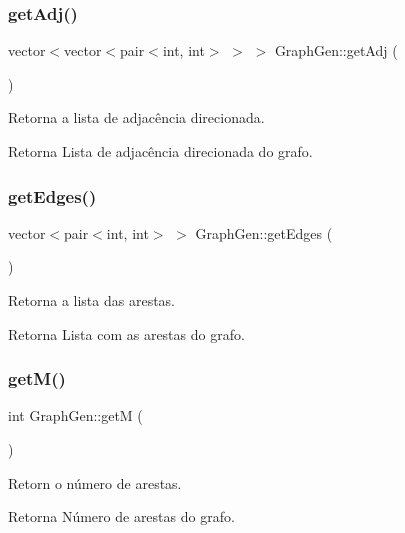 \subsubsection{\texorpdfstring{get\+Adj()}{getAdj()}}
{\footnotesize\ttfamily vector$<$vector$<$pair$<$int, int$>$ $>$ $>$ Graph\+Gen\+::get\+Adj (\begin{DoxyParamCaption}{ }\end{DoxyParamCaption})}

Retorna a lista de adjacência direcionada. \begin{DoxyReturn}{Retorna}
Lista de adjacência direcionada do grafo. 
\end{DoxyReturn}
\mbox{\label{classGraphGen_af140b74e5bbb7171a0b76f73d10c14ae}} 
\subsubsection{\texorpdfstring{get\+Edges()}{getEdges()}}
{\footnotesize\ttfamily vector$<$pair$<$int, int$>$ $>$ Graph\+Gen\+::get\+Edges (\begin{DoxyParamCaption}{ }\end{DoxyParamCaption})}

Retorna a lista das arestas. \begin{DoxyReturn}{Retorna}
Lista com as arestas do grafo. 
\end{DoxyReturn}
\mbox{\label{classGraphGen_aad12bcf774a0fa97150b01126d3a3e90}} 
\subsubsection{\texorpdfstring{get\+M()}{getM()}}
{\footnotesize\ttfamily int Graph\+Gen\+::getM (\begin{DoxyParamCaption}{ }\end{DoxyParamCaption})}

Retorn o número de arestas. \begin{DoxyReturn}{Retorna}
Número de arestas do grafo. 
\end{DoxyReturn}
\mbox{\label{classGraphGen_a32029b7e5e2c379bdc5412f0e954e121}} 
